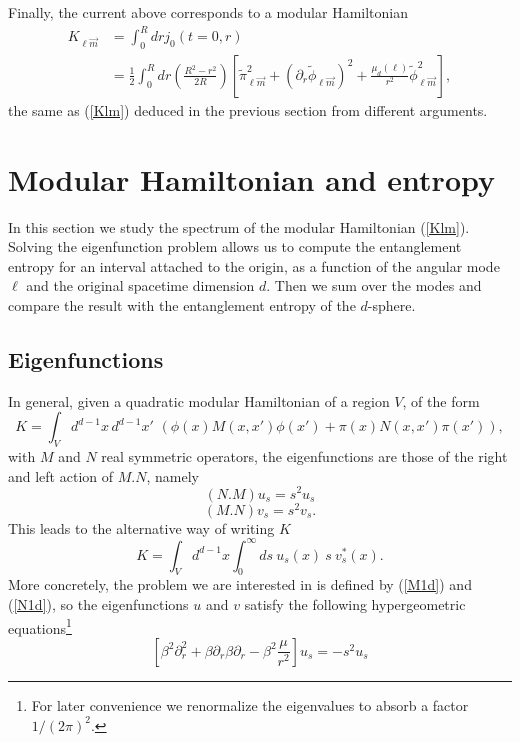 \documentclass[12pt,a4paper]{article}
\newcommand{\be}{\begin{equation}}
\newcommand{\ee}{\end{equation}}
\def\be{\begin{equation}}
\def\ee{\end{equation}}
\begin{document}
Finally, the current above corresponds to a modular Hamiltonian 
\begin{equation}
\begin{split}
K_{\ell \vec{m}} &=\int_0^R dr j_0 (t=0, r)\\
& = \frac{1}{2}\int_0^R dr  \left(\frac{R^2-r^2}{2 R}\right)\left[ \widetilde{\pi}_{\ell \vec{m}} ^2+ (\partial_r \widetilde{\phi}_{\ell \vec{m}})^2+\frac{\mu_d(\ell)}{r^2} \widetilde{\phi}_{\ell \vec{m}} ^2\right],
\end{split}
\end{equation}
the same as  (\ref{Klm}) deduced in the previous section from different arguments.

\section{Modular Hamiltonian and entropy}\label{sec:entropy}
In this section we study the spectrum of the modular Hamiltonian (\ref{Klm}). Solving the eigenfunction problem 	allows us to compute the entanglement entropy for an interval attached to the origin, as a function of the angular mode $\ell$ and the original spacetime dimension $d$. Then we sum over the modes and compare the result with the entanglement entropy of the $d$-sphere.
\subsection{Eigenfunctions}
In general, given a quadratic modular Hamiltonian of a region $V$,  of the form
\be
K=\int_V d^{d-1}x \,d^{d-1}x'\,\,\left(\phi(x)M(x,x')\phi(x')+\pi(x)N(x,x')\pi(x')\right),
\ee
with $M$ and $N$ real symmetric operators, the eigenfunctions are those of the right and left action of $M.N$, namely
\be
(N. M) u_{s}=s^2 u_{s}
\ee
\label{u}
\be
(M. N) v_{s}=s^2 v_{s}.
\label{v}
\ee
This leads to the alternative way of writing $K$
\begin{equation}
K=\int_V d^{d-1}x \int_0^{\infty} ds ~u_s(x)~ s~ v_s ^{*}(x).
\end{equation}
More concretely, the problem we are interested in is defined by (\ref{M1d}) and (\ref{N1d}), so the eigenfunctions $u$ and $v$ satisfy the following hypergeometric equations\footnote{For later convenience we renormalize the eigenvalues to absorb a factor $1/(2\pi)^2$.}
\be
\left[\beta^2\partial_r^2+\beta\partial_r\beta \partial_r-\beta^2 \frac{\mu}{r^2}\right]u_s= - s^2 u_s
\ee
\end{document}
